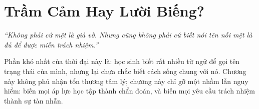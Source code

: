 \chapter{Trầm Cảm Hay Lười Biếng?}

\begin{center}
	\textit{\color{bookprimary}``Không phải cứ mệt là giả vờ. Nhưng cũng không phải cứ biết nói tên nỗi mệt là đủ để được miễn trách nhiệm.''}
\end{center}

\ngancach

\begin{tcolorbox}[
	colback=bookprimary!6,
	colframe=bookprimary!35,
	arc=5pt,
	title={\bfseries Chìa Khóa Của Chương},
	fonttitle=\bfseries\color{bookprimary}
]
Phần khó nhất của thời đại này là: học sinh biết rất nhiều từ ngữ để gọi tên trạng thái của mình, nhưng lại chưa chắc biết cách sống chung với nó. Chương này không phủ nhận tổn thương tâm lý; chương này chỉ gỡ một nhầm lẫn nguy hiểm: biến mọi áp lực học tập thành chẩn đoán, và biến mọi yêu cầu trách nhiệm thành sự tàn nhẫn.
\end{tcolorbox}

